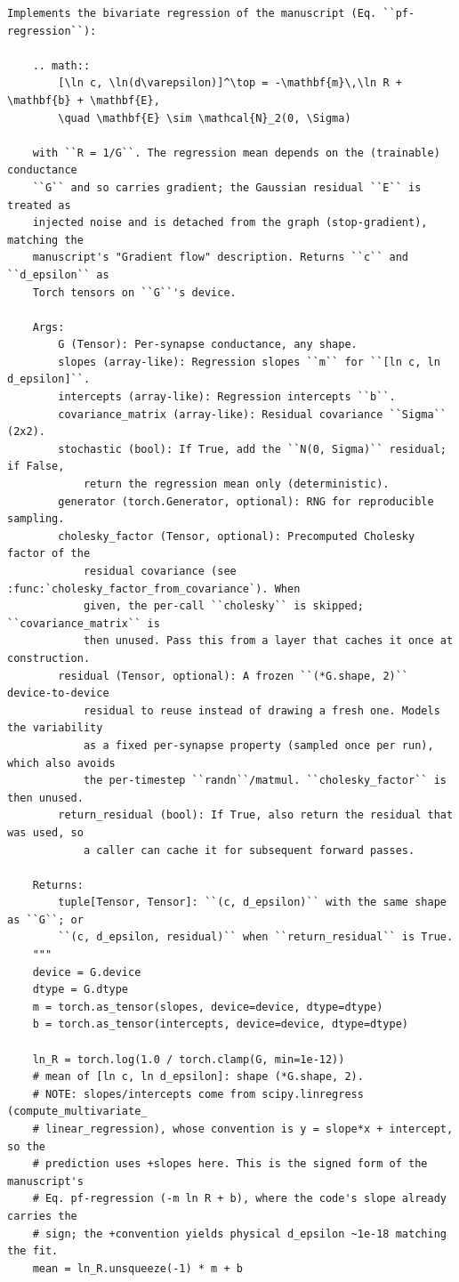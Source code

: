\begin{lstlisting}[caption={mnn\_torch/effects.py},label={lst:mnn-src-effects}]
    Implements the bivariate regression of the manuscript (Eq. ``pf-regression``):

    .. math::
        [\ln c, \ln(d\varepsilon)]^\top = -\mathbf{m}\,\ln R + \mathbf{b} + \mathbf{E},
        \quad \mathbf{E} \sim \mathcal{N}_2(0, \Sigma)

    with ``R = 1/G``. The regression mean depends on the (trainable) conductance
    ``G`` and so carries gradient; the Gaussian residual ``E`` is treated as
    injected noise and is detached from the graph (stop-gradient), matching the
    manuscript's "Gradient flow" description. Returns ``c`` and ``d_epsilon`` as
    Torch tensors on ``G``'s device.

    Args:
        G (Tensor): Per-synapse conductance, any shape.
        slopes (array-like): Regression slopes ``m`` for ``[ln c, ln d_epsilon]``.
        intercepts (array-like): Regression intercepts ``b``.
        covariance_matrix (array-like): Residual covariance ``Sigma`` (2x2).
        stochastic (bool): If True, add the ``N(0, Sigma)`` residual; if False,
            return the regression mean only (deterministic).
        generator (torch.Generator, optional): RNG for reproducible sampling.
        cholesky_factor (Tensor, optional): Precomputed Cholesky factor of the
            residual covariance (see :func:`cholesky_factor_from_covariance`). When
            given, the per-call ``cholesky`` is skipped; ``covariance_matrix`` is
            then unused. Pass this from a layer that caches it once at construction.
        residual (Tensor, optional): A frozen ``(*G.shape, 2)`` device-to-device
            residual to reuse instead of drawing a fresh one. Models the variability
            as a fixed per-synapse property (sampled once per run), which also avoids
            the per-timestep ``randn``/matmul. ``cholesky_factor`` is then unused.
        return_residual (bool): If True, also return the residual that was used, so
            a caller can cache it for subsequent forward passes.

    Returns:
        tuple[Tensor, Tensor]: ``(c, d_epsilon)`` with the same shape as ``G``; or
        ``(c, d_epsilon, residual)`` when ``return_residual`` is True.
    """
    device = G.device
    dtype = G.dtype
    m = torch.as_tensor(slopes, device=device, dtype=dtype)
    b = torch.as_tensor(intercepts, device=device, dtype=dtype)

    ln_R = torch.log(1.0 / torch.clamp(G, min=1e-12))
    # mean of [ln c, ln d_epsilon]: shape (*G.shape, 2).
    # NOTE: slopes/intercepts come from scipy.linregress (compute_multivariate_
    # linear_regression), whose convention is y = slope*x + intercept, so the
    # prediction uses +slopes here. This is the signed form of the manuscript's
    # Eq. pf-regression (-m ln R + b), where the code's slope already carries the
    # sign; the +convention yields physical d_epsilon ~1e-18 matching the fit.
    mean = ln_R.unsqueeze(-1) * m + b


\end{lstlisting}
